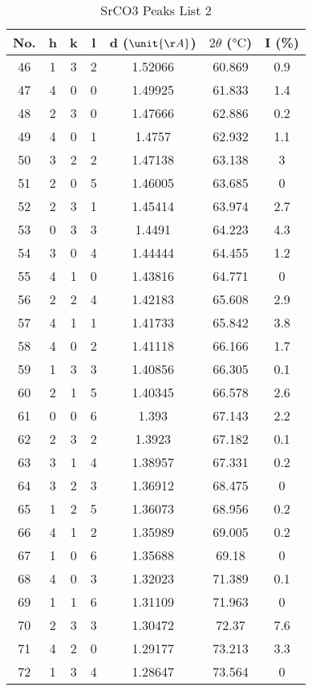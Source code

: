 \documentclass[11pt]{article}
\begin{document}
	\begin{table}[htbp]
		\centering
		\caption{SrCO3 Peaks List 2}
		\begin{tabular}{ccccccc}
			\toprule
			No. & h & k & l & d ($\unit{\AA}$) & $2\theta$ ($\unit{\degreeCelsius}$) & I (\%) \\
			\midrule
			46 & 1 & 3 & 2 & 1.52066 & 60.869 & 0.9 \\
			47 & 4 & 0 & 0 & 1.49925 & 61.833 & 1.4 \\
			48 & 2 & 3 & 0 & 1.47666 & 62.886 & 0.2 \\
			49 & 4 & 0 & 1 & 1.4757 & 62.932 & 1.1 \\
			50 & 3 & 2 & 2 & 1.47138 & 63.138 & 3 \\
			51 & 2 & 0 & 5 & 1.46005 & 63.685 & 0 \\
			52 & 2 & 3 & 1 & 1.45414 & 63.974 & 2.7 \\
			53 & 0 & 3 & 3 & 1.4491 & 64.223 & 4.3 \\
			54 & 3 & 0 & 4 & 1.44444 & 64.455 & 1.2 \\
			55 & 4 & 1 & 0 & 1.43816 & 64.771 & 0 \\
			56 & 2 & 2 & 4 & 1.42183 & 65.608 & 2.9 \\
			57 & 4 & 1 & 1 & 1.41733 & 65.842 & 3.8 \\
			58 & 4 & 0 & 2 & 1.41118 & 66.166 & 1.7 \\
			59 & 1 & 3 & 3 & 1.40856 & 66.305 & 0.1 \\
			60 & 2 & 1 & 5 & 1.40345 & 66.578 & 2.6 \\
			61 & 0 & 0 & 6 & 1.393 & 67.143 & 2.2 \\
			62 & 2 & 3 & 2 & 1.3923 & 67.182 & 0.1 \\
			63 & 3 & 1 & 4 & 1.38957 & 67.331 & 0.2 \\
			64 & 3 & 2 & 3 & 1.36912 & 68.475 & 0 \\
			65 & 1 & 2 & 5 & 1.36073 & 68.956 & 0.2 \\
			66 & 4 & 1 & 2 & 1.35989 & 69.005 & 0.2 \\
			67 & 1 & 0 & 6 & 1.35688 & 69.18 & 0 \\
			68 & 4 & 0 & 3 & 1.32023 & 71.389 & 0.1 \\
			69 & 1 & 1 & 6 & 1.31109 & 71.963 & 0 \\
			70 & 2 & 3 & 3 & 1.30472 & 72.37 & 7.6 \\
			71 & 4 & 2 & 0 & 1.29177 & 73.213 & 3.3 \\
			72 & 1 & 3 & 4 & 1.28647 & 73.564 & 0 \\

\end{tabular}
\end{table}
\end{document}

